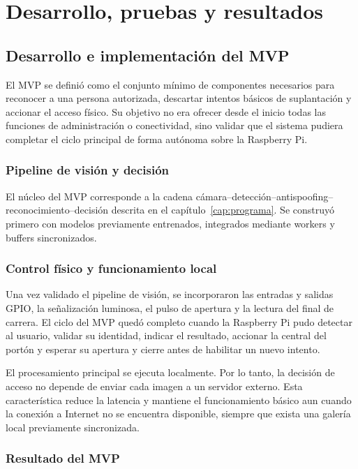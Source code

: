 \chapter{Desarrollo, pruebas y resultados}
\label{cap:desarrollo}

\section{Desarrollo e implementación del MVP}

El MVP se definió como el conjunto mínimo de componentes necesarios para reconocer a una persona autorizada, descartar intentos básicos de suplantación y accionar el acceso físico. Su objetivo no era ofrecer desde el inicio todas las funciones de administración o conectividad, sino validar que el sistema pudiera completar el ciclo principal de forma autónoma sobre la Raspberry Pi.

\subsection{Pipeline de visión y decisión}

El núcleo del MVP corresponde a la cadena cámara--detección--antispoofing--reconocimiento--decisión descrita en el capítulo~\ref{cap:programa}. Se construyó primero con modelos previamente entrenados, integrados mediante workers y buffers sincronizados.

\subsection{Control físico y funcionamiento local}

Una vez validado el pipeline de visión, se incorporaron las entradas y salidas GPIO, la señalización luminosa, el pulso de apertura y la lectura del final de carrera. El ciclo del MVP quedó completo cuando la Raspberry Pi pudo detectar al usuario, validar su identidad, indicar el resultado, accionar la central del portón y esperar su apertura y cierre antes de habilitar un nuevo intento.

El procesamiento principal se ejecuta localmente. Por lo tanto, la decisión de acceso no depende de enviar cada imagen a un servidor externo. Esta característica reduce la latencia y mantiene el funcionamiento básico aun cuando la conexión a Internet no se encuentra disponible, siempre que exista una galería local previamente sincronizada.

\subsection{Resultado del MVP}

